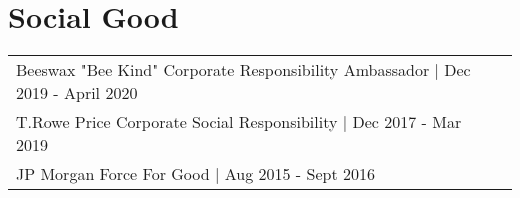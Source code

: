 \documentclass[a4paper]{deedy-resume-openfont} %
\begin{document}
\begin{minipage}[t]{0.66\textwidth}






\sectionspace %


\section{Social Good}
 \begin{tabular}{lll}
 Beeswax "Bee Kind" Corporate Responsibility Ambassador | Dec 2019 - April 2020 \\
 T.Rowe Price Corporate Social Responsibility | Dec 2017 - Mar 2019 \\
 JP Morgan Force For Good | Aug 2015 - Sept 2016 \\
\end{tabular}





\end{minipage} %
\end{document}
